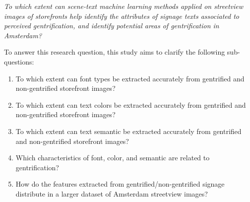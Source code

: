 \noindent\textit{To which extent can scene-text machine learning methods applied on streetview images of storefronts help identify the attributes of signage texts associated to perceived gentrification, and identify potential areas of gentrification in Amsterdam?}

To answer this research question, this study aims to clarify the following sub-questions: 

\begin{enumerate}
    \item To which extent can font types be extracted accurately from gentrified and non-gentrified storefront images?
    \item To which extent can text colors be extracted accurately from gentrified and non-gentrified storefront images?
    \item To which extent can text semantic be extracted accurately from gentrified and non-gentrified storefront images?
    \item Which characteristics of font, color, and semantic are related to gentrification?
    \item How do the features extracted from gentrified/non-gentrified signage distribute in a larger dataset of Amsterdam streetview images?
\end{enumerate}
